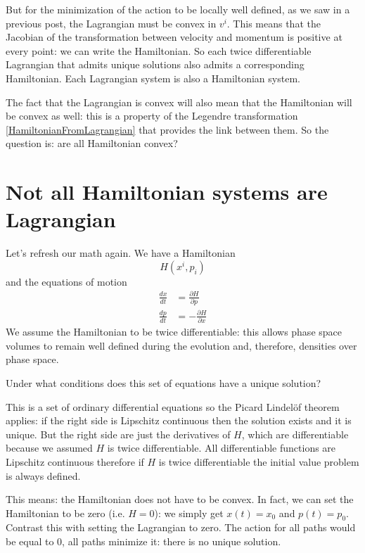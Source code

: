 \documentclass[aps,pra,10pt,floatfix,nofootinbib]{revtex4-1}
\theoremstyle{definition}
\begin{document}
But for the minimization of the action to be locally well defined, as we saw in a previous post, the Lagrangian must be convex in $v^i$. This means that the Jacobian of the transformation between velocity and momentum is positive at every point: we can write the Hamiltonian. So each twice differentiable Lagrangian that admits unique solutions also admits a corresponding Hamiltonian. Each Lagrangian system is also a Hamiltonian system.

The fact that the Lagrangian is convex will also mean that the Hamiltonian will be convex as well: this is a property of the Legendre transformation \eqref{HamiltonianFromLagrangian} that provides the link between them. So the question is: are all Hamiltonian convex?

\section{Not all Hamiltonian systems are Lagrangian}

Let's refresh our math again. We have a Hamiltonian
\begin{equation}
\label{Hamiltonian}
H(x^i, p_i)
\end{equation}
and the equations of motion
\begin{equation}
\begin{aligned}
\frac{dx}{dt} &= \frac{\partial H}{\partial p} \\
\frac{dp}{dt} &= - \frac{\partial H}{\partial x}
\end{aligned}
\label{HamiltonEquations}
\end{equation}
We assume the Hamiltonian to be twice differentiable: this allows phase space volumes to remain well defined during the evolution and, therefore, densities over phase space.

Under what conditions does this set of equations have a unique solution?

This is a set of ordinary differential equations so the Picard Lindelöf theorem applies: if the right side is Lipschitz continuous then the solution exists and it is unique. But the right side are just the derivatives of $H$, which are differentiable because we assumed $H$ is twice differentiable. All differentiable functions are Lipschitz continuous therefore if $H$ is twice differentiable the initial value problem is always defined.

This means: the Hamiltonian does not have to be convex. In fact, we can set the Hamiltonian to be zero (i.e. $H=0$): we simply get $x(t)=x_0$ and $p(t)=p_0$. Contrast this with setting the Lagrangian to zero. The action for all paths would be equal to $0$, all paths minimize it: there is no unique solution.
\end{document}
